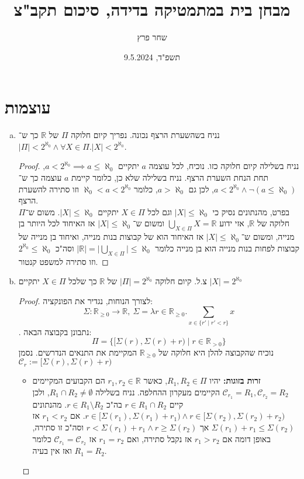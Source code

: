 \documentclass[]{article}
\title{מבחן בית במתמטיקה בדידה, סיכום תקב"צ}
\author{שחר פרץ}
\date{תשפ"ד, 9.5.2024}
\newcommand\R     {\mathbb{R}}
\newcommand\cc    {\mathcal{C}}
\newcommand\az    {\aleph_0}
\newcommand\taz   {2^{\aleph_0}}
\begin{document}
	\maketitle
	\section{עוצמות}
	
	\begin{enumerate}[(a)]
		\item נניח בשהשערת הרצף נכונה. נפריך קיום חלוקה $\Pi$ של $\R$ כך ש־$|\Pi| < \taz \land \forall X \in \Pi. |X| < \taz$. 
		\begin{proof}
			נניח בשלילה קיום חלוקה כזו. נוכיח, לכל עוצמה $a$ יתקיים $a < \taz \implies a \le \az$, תחת הנחת השערת הרצף. נניח בשלילה שלא כן, כלומר קיימת $a$ עוצמה כך ש־$a < \taz \land \lnot (a \le \az)$, לכן גם $a > \az$, כלומר $\az < a < \taz$ וזו סתירה להשערת הרצף. \\
			בפרט, מהנתונים נסיק כי $|X| \le \az$ וגם לכל $X \in \Pi$ יתקיים $|X| \le \az$. משום ש־$\Pi$ חלוקה של $\R$, אזי ידוע $\bigcup_{X \in \Pi} X = \R$ ומשום ש־$|X| \le \az$ אז האיחוד לכל היותר בן מנייה, ומשום ש־$|X| \le \az$ אז האיחוד הוא של קבוצות בנות מנייה, ואיחוד בן מנייה של קבוצות לפחות בנות מנייה הוא בן מנייה כלומר $|\R| = \Big | \bigcup_{X \in \Pi}\Big| \le \az$ וסה"כ $\taz \le \az$ וזו סתירה למשפט קנטור. 
		\end{proof}
		\item צ.ל. קיום חלוקה $|\Pi| = \taz$ של $\R$ כך שלכל $X \in \Pi$ יתקיים $|X| = \taz$ \begin{proof}
			\newcommand\Rge {\R_{\ge 0}}
			לצורך הנוחות, נגדיר את הפונקציה:
			\[ \Sigma \colon \Rge \to \R, \ \Sigma = \lambda r \in \Rge. \sum_{x \in \{r' \mid r' < r\}} x \]
			. נתבונן בקבוצה הבאה: 
			\[ \Pi = \Big \{ [\Sigma(r), \Sigma(r) + r ) \mid r \in \R_{> 0} \Big \} \]
			נוכיח שהקבוצה להלן היא חלוקה של $\Rge$ המקיימת את התנאים הנדרשים. נסמן                 $\cc_r := [\Sigma(r), \Sigma(r) + r) $
			\begin{itemize}
				\item \textbf{זרות בזוגות: }יהיו $R_1, R_2 \in \Pi$, כאשר $r_1, r_2 \in \R$ הם הקבועים המקיימים $\cc_{r_1} = R_1, \cc_{r_2} = R_2$ הקיימים מעקרון ההחלפה. נניח בשלילה $R_1 \cap R_2 \neq \emptyset$, ולכן קיים $r \in R_1 \cap R_2$ בה"כ $r \in R_1 \setminus R_2$. מהנתונים $r \in [\Sigma(r_1), \Sigma(r_1) + r_1) \land r \in [\Sigma(r_2), \Sigma(r_2) + r_2)$. אם $r_1 < r_2$ אז $\Sigma(r_1) + r_1 \le \Sigma(r_2)$ אך $r < \Sigma(r_1) + r_1 \land r \ge \Sigma(r_2) $ וסה"כ זו סתירה, באופן דומה אם $r_1 > r_2$ אז נקבל סתירה, ואם $r_1 = r_2$ אז $\cc_{r_1} = \cc_{r_2}$ כלומר $R_1 = R_2$ ואז אין בעיה. 

\end{itemize}
\end{proof}
\end{enumerate}
\end{document}
